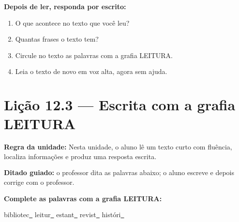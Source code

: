 \textbf{Depois de ler, responda por escrito:}
\begin{enumerate}

  \item O que acontece no texto que você leu?
  \begin{center}
  \underline{\hspace{12cm}}
  \end{center}

  \item Quantas frases o texto tem?
  \begin{center}
  \underline{\hspace{12cm}}
  \end{center}

  \item Circule no texto as palavras com a grafia LEITURA.

  \item Leia o texto de novo em voz alta, agora sem ajuda.

\end{enumerate}

\section{Lição 12.3 --- Escrita com a grafia LEITURA}

\noindent\textbf{Regra da unidade:} Nesta unidade, o aluno lê um texto curto com fluência, localiza informações e produz uma resposta escrita.


\noindent\textbf{Ditado guiado:} o professor dita as palavras abaixo; o aluno escreve e depois corrige com o professor.

\begin{center}
  \underline{\hspace{2.3cm}} \quad \underline{\hspace{2.3cm}} \quad \underline{\hspace{2.3cm}} \quad \underline{\hspace{2.3cm}}

  \underline{\hspace{2.3cm}} \quad \underline{\hspace{2.3cm}} \quad \underline{\hspace{2.3cm}} \quad \underline{\hspace{2.3cm}}
\end{center}

\noindent\textbf{Complete as palavras com a grafia LEITURA:}
\begin{center}
  bibliotec\underline{~} \quad leitur\underline{~} \quad estant\underline{~} \quad revist\underline{~} \quad históri\underline{~}
\end{center}

